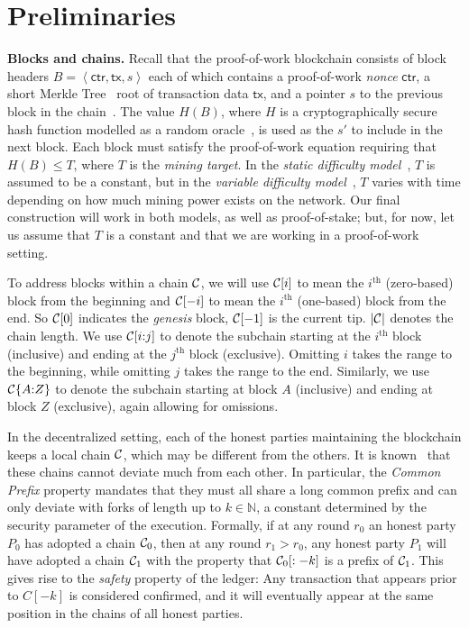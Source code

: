 \section{Preliminaries}

\noindent
\textbf{Blocks and chains.}
Recall that
the proof-of-work blockchain consists of block headers $B = \left<\textsf{ctr}, \textsf{tx}, s\right>$ each of
which contains a proof-of-work \emph{nonce} $\textsf{ctr}$, a short Merkle Tree~\cite{merkle}
root of transaction
data $\textsf{tx}$, and a pointer $s$ to the previous block in the chain~\cite{backbone}. The value $H(B)$, where
$H$ is a cryptographically secure hash function modelled as a random oracle~\cite{ro}, is used as the $s'$
to include in the next block. Each block must satisfy the proof-of-work equation requiring that
$H(B) \leq T$, where $T$ is the \emph{mining target}. In the \emph{static difficulty model}~\cite{backbone,backbone-new},
$T$ is assumed to be a constant, but in the \emph{variable difficulty model}~\cite{varbackbone}, $T$ varies with
time depending on how much mining power exists on the network. Our final construction will work
in both models, as well as proof-of-stake; but, for now, let us assume that $T$ is a constant and
that we are working in a proof-of-work setting.

To address blocks within a chain $\mathcal{C}$, we will use $\mathcal{C}[i]$ to mean the $i^\text{th}$ (zero-based)
block from the beginning and $\mathcal{C}[-i]$ to mean the $i^\text{th}$ (one-based) block from the end.
So $\mathcal{C}[0]$ indicates the \emph{genesis} block, $\mathcal{C}[-1]$ is the current tip.
$|\mathcal{C}|$ denotes the chain length. We use $\mathcal{C}[i{:}j]$
to denote the subchain starting at the $i^\text{th}$ block (inclusive) and ending at the $j^\text{th}$
block (exclusive).
Omitting $i$ takes the range to the beginning, while
omitting $j$ takes the range to the end.
Similarly, we use $\mathcal{C}\{A{:}Z\}$ to denote the subchain starting at block $A$
(inclusive) and ending at block $Z$ (exclusive), again allowing for omissions.

In the decentralized setting, each of the honest parties maintaining the blockchain keeps a local
chain $\mathcal{C}$, which may be different from the others. It is known~\cite{backbone} that these chains
cannot deviate much from each other. In particular, the \emph{Common Prefix} property mandates
that they must all share a long common prefix and can only deviate with forks of length up
to $k \in \mathbb{N}$, a constant determined by the security parameter of the execution.
Formally, if at any round $r_0$ an honest party $P_0$ has adopted a chain $\mathcal{C}_0$, then
at any round $r_1 > r_0$, any honest party $P_1$ will have adopted a chain $\mathcal{C}_1$
with the property that $\mathcal{C}_0[:-k]$ is a prefix of $\mathcal{C}_1$.
This gives rise to the \emph{safety} property of the ledger: Any transaction that appears
prior to $C[-k]$ is considered confirmed, and it will eventually appear at the same position
in the chains of all honest parties.

